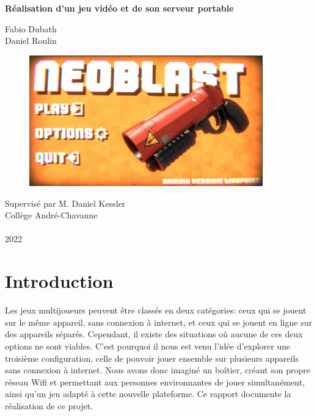 \documentclass[a4paper]{article}
\begin{document}
\begin{titlepage}
   \begin{center}
        \vspace*{1cm}
        
        \Huge
        \textbf{Réalisation d'un jeu vidéo et de son serveur portable}
            
        \vspace{1.5cm}
        
        \LARGE
        Fabio Dubath \\
        Daniel Roulin
        \vspace{1.25cm}

\begin{figure}[h]
        \centering
        \includegraphics[width=0.9\textwidth]{images/game/start_menu.png}

\end{figure}

        \vfill
        
        \Large
        
        Supervisé par M. Daniel Kessler\\
        Collège André-Chavanne\\~\\
        2022
            
   \end{center}
\end{titlepage}

\newpage

\tableofcontents

\newpage

\section{Introduction}
Les jeux multijoueurs peuvent être classés en deux catégories: ceux qui se jouent sur le même appareil, sans connexion à internet, et ceux qui se jouent en ligne sur des appareils séparés. Cependant, il existe des situations où aucune de ces deux options ne sont viables. C'est pourquoi il nous est venu l'idée d'explorer une troisième configuration, celle de pouvoir jouer ensemble sur plusieurs appareils sans connexion à internet. Nous avons donc imaginé un boîtier, créant son propre réseau Wifi et permettant aux personnes environnantes de jouer simultanément, ainsi qu'un jeu adapté à cette nouvelle plateforme. Ce rapport documente la réalisation de ce projet.
\end{document}
